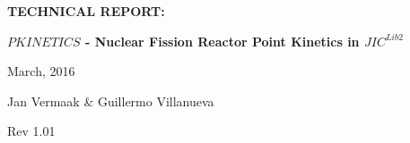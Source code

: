 \documentclass[11pt,letterpaper,titlepage]{article}
\begin{document}
\newcommand{\NSCDOCNUMBR}{NSC-REP-15-X}         %
\newcommand{\NSCDOCSUBJT}{TECHNICAL REPORT: }   %
\newcommand{\NSCDOCTITLE}{$PKINETICS$ - Nuclear Fission Reactor Point Kinetics in $JIC^{Lib2}$}       %
\newcommand{\NSCDOCDATE} {March, 2016}    %
\newcommand{\NSCDOCREV}  {Rev 1.01} %



\begin{titlepage}
	\pagestyle{fancy}
	\vspace*{1.0cm}
	\centering
	\vspace{1cm}
	\vspace{.25cm}
	{\Large\bfseries  \NSCDOCSUBJT \par} 
	{\Large\bfseries \NSCDOCTITLE  \par}
	\vspace{1cm}
	{\Large \NSCDOCDATE \par}
	\vspace{1.0cm}
	{\Large Jan Vermaak \& Guillermo Villanueva \par}
	{\Large \NSCDOCREV \par}
		

	\begin{center}
		\begin{minipage}[c]{0.55\textwidth}
	

\end{minipage}
\end{center}
\end{titlepage}
\end{document}
